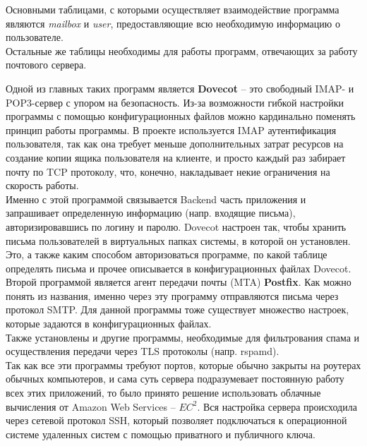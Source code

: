 \documentclass{article}
\begin{document}
Основными таблицами, с которыми осуществляет взаимодействие программа являются \emph{mailbox} и \emph{user}, предоставляющие всю необходимую информацию о пользователе. \\

Остальные же таблицы необходимы для работы программ, отвечающих за работу почтового сервера.

Одной из главных таких программ является \textbf{Dovecot} -- это свободный IMAP- и POP3-сервер с упором на безопасность. Из-за возможности гибкой настройки программы с помощью конфигурационных файлов
можно кардинально поменять принцип работы программы. В проекте используется IMAP аутентификация пользователя, так как она требует меньше дополнительных затрат ресурсов на создание копии ящика пользователя на клиенте, и просто каждый раз забирает почту по TCP протоколу, что, конечно, накладывает некие ограничения на скорость работы. \\

Именно с этой программой связывается Backend часть приложения и запрашивает определенную информацию (напр. входящие письма), авторизировавшись по логину и паролю. Dovecot настроен так, чтобы хранить письма пользователей в виртуальных папках системы, в которой он установлен. Это, а также каким способом авторизоваться программе, по какой таблице определять письма и прочее описывается в конфигурационных файлах Dovecot. \\

Второй программой является агент передачи почты (MTA) \textbf{Postfix}. Как можно понять из названия, именно через эту программу отправляются письма через протокол SMTP. Для данной программы тоже существует множество настроек, которые задаются в конфигурационных файлах. \\

Также установлены и другие программы, необходимые для фильтрования спама и осуществления передачи через TLS протоколы (напр. rspamd). \\

Так как все эти программы требуют портов, которые обычно закрыты на роутерах обычных компьютеров, и сама суть сервера подразумевает постоянную работу всех этих приложений, то было принято решение использовать облачные вычисления от Amazon Web Services -- $EC^2$. 
Вся настройка сервера происходила через сетевой протокол SSH, который позволяет подключаться к операционной системе удаленных систем с помощью приватного и публичного ключа.  \\
\end{document}
